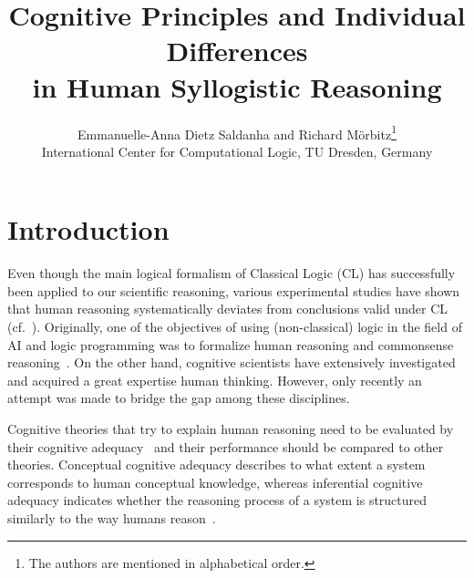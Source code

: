 \documentclass[12pt]{article}
\title{Cognitive Principles and Individual Differences \\ in Human Syllogistic Reasoning}
\author{
Emmanuelle-Anna Dietz Saldanha and Richard M{\"o}rbitz\thanks{The authors are mentioned in alphabetical order.} \\
\normalsize International Center for Computational Logic, TU
  Dresden, Germany
}
\date{}
\begin{document}
\maketitle

\section{Introduction}
% 
% 

Even though the main logical formalism of Classical Logic (CL) has successfully been applied to our scientific reasoning,
various experimental studies have shown that human reasoning systematically deviates 
from conclusions valid under CL (cf.~\cite{wason:68,byrne:89}). Originally, one of the objectives of using (non-classical) logic in the field of AI and logic programming was to formalize human reasoning and commonsense reasoning~\cite{McCarthy59,McCarthy98}. 
On the other hand, cognitive scientists have extensively investigated and acquired a great expertise human thinking.
However, only recently an attempt was made to bridge the gap among these disciplines.


Cognitive theories that try to explain human reasoning need to be evaluated by their cognitive adequacy~\cite{strube:1992} and their performance should be compared to other theories.
Conceptual cognitive adequacy describes to what extent a system corresponds to human conceptual knowledge, whereas inferential cognitive adequacy indicates whether the reasoning process of a system is structured similarly to the way humans reason~\cite{knauff:rauh:renz:1997}. 
\end{document}
